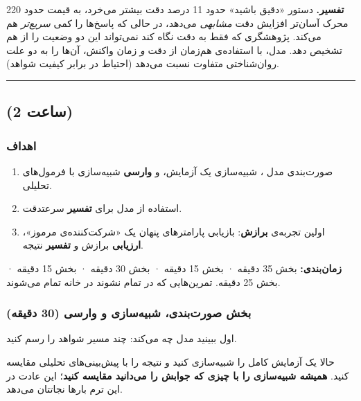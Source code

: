\textbf{تفسیر.} دستور «دقیق باشید» حدود 11 درصد دقت بیشتر می‌خرد، به قیمت
حدود 220  محرک آسان‌تر افزایش دقت \emph{مشابهی} می‌دهد، در حالی که
پاسخ‌ها را کمی \emph{سریع‌تر} هم می‌کند. پژوهشگری که فقط به دقت نگاه کند
نمی‌تواند این دو وضعیت را از هم تشخیص دهد. مدل، با استفاده‌ی هم‌زمان از دقت
\emph{و} زمان واکنش، آن‌ها را به دو علت روان‌شناختی متفاوت نسبت می‌دهد
(احتیاط در برابر کیفیت شواهد).

\begin{center}\rule{0.5\linewidth}{0.5pt}\end{center}


\subsection{\texorpdfstring{ (2 ساعت)}{lab (2 ساعت)}}

\subsubsection{اهداف}

\begin{enumerate}
\def\labelenumi{\arabic{enumi}.}
\tightlist
\item
  صورت‌بندی مدل ، شبیه‌سازی یک آزمایش، و \textbf{وارسی}
  شبیه‌سازی با فرمول‌های تحلیلی.
\item
  استفاده از مدل برای \textbf{تفسیر}  سرعت\lr{--}دقت.
\item
  اولین تجربه‌ی \textbf{برازش}: بازیابی پارامترهای پنهان یک «شرکت‌کننده‌ی
  مرموز»، \textbf{ارزیابی} برازش و \textbf{تفسیر} نتیجه.
\end{enumerate}

\textbf{زمان‌بندی:} بخش  35 دقیقه · بخش  15 دقیقه · بخش
 30 دقیقه · بخش  15 دقیقه · بخش  25 دقیقه. تمرین‌هایی
که در  تمام نشوند در خانه تمام می‌شوند.

\subsubsection{\texorpdfstring{بخش  صورت‌بندی، شبیه‌سازی و وارسی
 (30
دقیقه)}{بخش C: صورت‌بندی، شبیه‌سازی و وارسی random walk (30 دقیقه)}}

اول ببینید مدل چه می‌کند: چند مسیر شواهد را رسم کنید.

حالا یک آزمایش کامل را شبیه‌سازی کنید و نتیجه را با پیش‌بینی‌های تحلیلی
مقایسه کنید. \textbf{همیشه شبیه‌سازی را با چیزی که جوابش را می‌دانید
مقایسه کنید}؛ این عادت در این ترم بارها نجاتتان می‌دهد.

